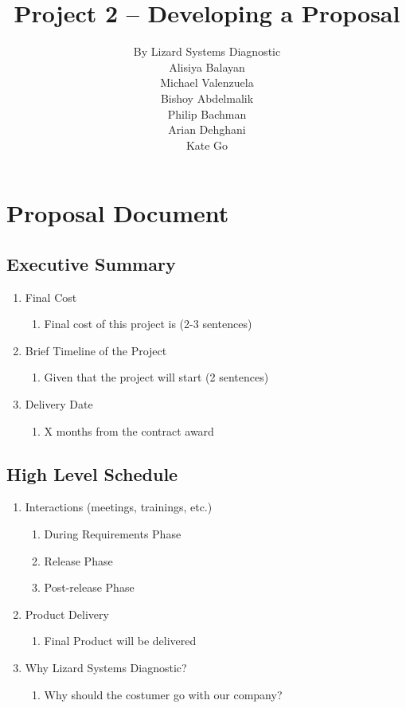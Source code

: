 \documentclass{article}
\title{Project 2 – Developing a Proposal}
\author{
By Lizard Systems Diagnostic\\
Alisiya Balayan\\
Michael Valenzuela\\
Bishoy Abdelmalik\\
Philip Bachman\\
Arian Dehghani\\
Kate Go
}
\begin{document}
\maketitle

\pagebreak
\tableofcontents
\pagebreak

\section{Proposal Document}
\subsection{Executive Summary}
\begin{enumerate}
\item Final Cost
  \begin{enumerate}
  \item Final cost of this project is (2-3 sentences)
  \end{enumerate}
\item Brief Timeline of the Project
  \begin{enumerate}
  \item Given that the project will start (2 sentences)
  \end{enumerate}
\item Delivery Date
  \begin{enumerate}
  \item X months from the contract award
  \end{enumerate}
\end{enumerate}

\subsection{High Level Schedule}
\begin{enumerate}
\item Interactions (meetings, trainings, etc.)
  \begin{enumerate}
  \item During Requirements Phase
  \item Release Phase
  \item Post-release Phase
  \end{enumerate}
\item Product Delivery
  \begin{enumerate}
  \item Final Product will be delivered
  \end{enumerate}
\item Why Lizard Systems Diagnostic?
  \begin{enumerate}
  \item Why should the costumer go with our company?
  \end{enumerate}
\end{enumerate}
\end{document}
